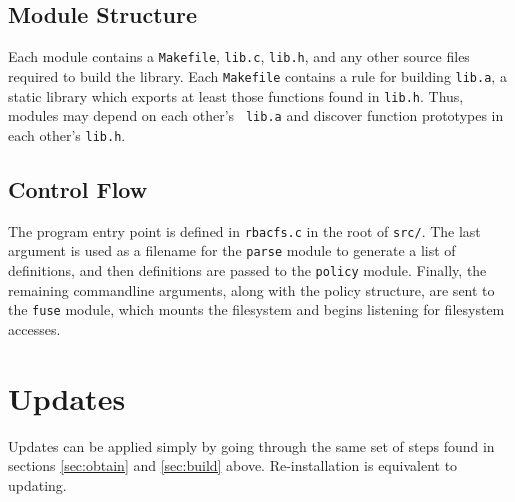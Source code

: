 \documentclass[11pt,oneside,letterpaper]{article}
\begin{document}
\subsection{Module Structure}

Each module contains a {\tt Makefile}, {\tt lib.c}, {\tt lib.h}, and any other
source files required to build the library. Each {\tt Makefile} contains a rule
for building {\tt lib.a}, a static library which exports at least those
functions found in {\tt lib.h}. Thus, modules may depend on each other's {\tt
lib.a} and discover function prototypes in each other's {\tt lib.h}.

\subsection{Control Flow}

The program entry point is defined in {\tt rbacfs.c} in the root of {\tt src/}. The last argument is used as a filename for the {\tt parse} module to
generate a list of definitions, and then definitions are passed to the
{\tt policy} module. Finally, the remaining commandline arguments, along
with the policy structure, are sent to the {\tt fuse} module, which
mounts the filesystem and begins listening for filesystem accesses.

\section{Updates}

Updates can be applied simply by going through the same set of steps found
in sections \ref{sec:obtain} and \ref{sec:build} above. Re-installation is
equivalent to updating.
\end{document}
